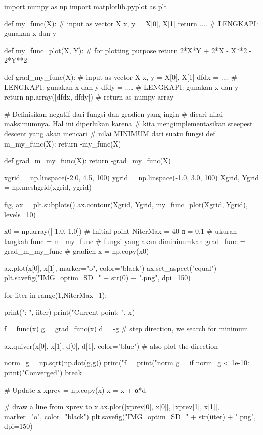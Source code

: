 \begin{pythoncode}
import numpy as np
import matplotlib.pyplot as plt

def my_func(X): # input as vector X
    x, y = X[0], X[1]
    return .... # LENGKAPI: gunakan x dan y 

def my_func_plot(X, Y): # for plotting purpose
    return 2*X*Y + 2*X - X**2 - 2*Y**2

def grad_my_func(X): # input as vector X
    x, y = X[0], X[1]
    dfdx = .... # LENGKAPI: gunakan x dan y
    dfdy = .... # LENGKAPI: gunakan x dan y
    return np.array([dfdx, dfdy]) # return as numpy array

# Definisikan negatif dari fungsi dan gradien yang ingin
# dicari nilai maksimumnya. Hal ini diperlukan karena
# kita mengimplementasikan steepest descent yang akan mencari
# nilai MINIMUM dari suatu fungsi
def m_my_func(X):
    return -my_func(X)

def grad_m_my_func(X):
    return -grad_my_func(X)

xgrid = np.linspace(-2.0, 4.5, 100)
ygrid = np.linspace(-1.0, 3.0, 100)
Xgrid, Ygrid = np.meshgrid(xgrid, ygrid)

fig, ax = plt.subplots()
ax.contour(Xgrid, Ygrid, my_func_plot(Xgrid, Ygrid), levels=10)

x0 = np.array([-1.0, 1.0]) # Initial point
NiterMax = 40
α = 0.1 # ukuran langkah
func = m_my_func # fungsi yang akan dimininumkan
grad_func = grad_m_my_func  # gradien
x = np.copy(x0)

ax.plot(x[0], x[1], marker="o", color="black")
ax.set_aspect("equal")
plt.savefig("IMG_optim_SD_" + str(0) + ".png", dpi=150)

for iiter in range(1,NiterMax+1):

    print("\nIteration: ", iiter)
    print("Current point: ", x)

    f = func(x)
    g = grad_func(x)
    d = -g # step direction, we search for minimum

    ax.quiver(x[0], x[1], d[0], d[1], color="blue") # also plot the direction

    norm_g = np.sqrt(np.dot(g,g))
    print("f      = %
    print("norm g = %
    if norm_g < 1e-10:
        print("Converged")
        break

    # Update x
    xprev = np.copy(x)
    x = x + α*d

    # draw a line from xprev to x
    ax.plot([xprev[0], x[0]], [xprev[1], x[1]], marker="o", color="black")
    plt.savefig("IMG_optim_SD_" + str(iiter) + ".png", dpi=150)
\end{pythoncode}

